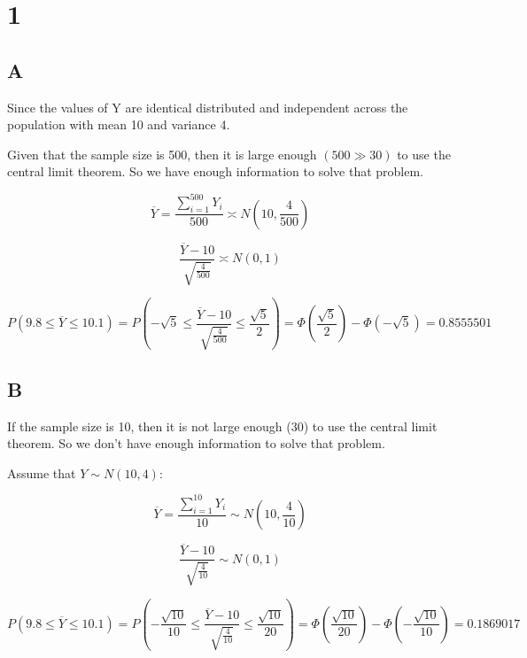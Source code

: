 \documentclass{article}
\begin{document}
	\section*{1}
	\subsection*{A}
		Since the values of Y are identical distributed and independent across the population with mean 10 and variance 4.
		
		Given that the sample size is 500, then it is large enough $(500\gg30)$ to use the central limit theorem. So we have enough information to solve that problem.
		
		\begin{equation*}
			\overline{Y}=\frac{\sum_{i=1}^{500} Y_i}{500}\asymp N(10,\frac{4}{500})
		\end{equation*}
		
		\begin{equation*}
			\frac{\overline{Y}-10}{\sqrt{\frac{4}{500}}}\asymp N(0,1)
		\end{equation*}
		
		\begin{equation*}
			P(9.8\le\overline{Y}\le 10.1)=P(-\sqrt{5}\le\frac{\overline{Y}-10}{\sqrt{\frac{4}{500}}}\le\frac{\sqrt{5}}{2})=\Phi(\frac{\sqrt{5}}{2})-\Phi(-\sqrt{5})= 0.8555501
		\end{equation*}
		
	\subsection*{B}
		If the sample size is 10, then it is not large enough (30) to use the central limit theorem. So we don't have enough information to solve that problem.
		
		Assume that $Y\sim N(10,4)$:
		
		\begin{equation*}
			\overline{Y}=\frac{\sum_{i=1}^{10} Y_i}{10}\sim N(10,\frac{4}{10})
		\end{equation*}
		
		\begin{equation*}
			\frac{\overline{Y}-10}{\sqrt{\frac{4}{10}}}\sim N(0,1)
		\end{equation*}
		
		\begin{equation*}
			P(9.8\le\overline{Y}\le 10.1)=P(-\frac{\sqrt{10}}{10}\le\frac{\overline{Y}-10}{\sqrt{\frac{4}{10}}}\le\frac{\sqrt{10}}{20})=\Phi(\frac{\sqrt{10}}{20})-\Phi(-\frac{\sqrt{10}}{10})= 0.1869017
		\end{equation*}
\end{document}
